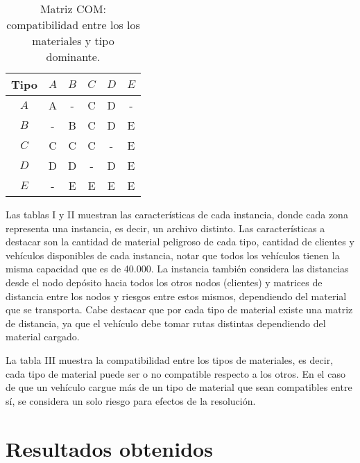 \documentclass[conference]{IEEEtran}
\begin{document}
\begin{table}[H]
\caption{Matriz COM: compatibilidad entre los los materiales y tipo dominante.}
\begin{center}
\begin{tabular}{|c|c|c|c|c|c|}
\hline
\textbf{Tipo}& $A$ & $B$ & $C$ & $D$ & $E$\\
 
\hline
$A$& A & - & C & D & -\\
\hline
$B$& - & B & C & D & E\\
\hline
$C$& C & C & C & - & E\\
\hline
$D$& D & D & - & D & E\\
\hline
$E$& - & E & E & E & E\\
\hline
\end{tabular}
\label{tab1}
\end{center}
\end{table}

Las tablas I y II muestran las caracter\'isticas de cada instancia, donde cada zona representa una instancia, es decir, un archivo distinto. Las caracter\'isticas a destacar son la cantidad de material peligroso de cada tipo, cantidad de clientes y veh\'iculos disponibles de cada instancia, notar que todos los veh\'iculos tienen la misma capacidad que es de 40.000. La instancia tambi\'en considera las distancias desde el nodo dep\'osito hacia todos los otros nodos (clientes) y matrices de distancia entre los nodos y riesgos entre estos mismos, dependiendo del material que se transporta. Cabe destacar que por cada tipo de material existe una matriz de distancia, ya que el veh\'iculo debe tomar rutas distintas dependiendo del material cargado.

La tabla III muestra la compatibilidad entre los tipos de materiales, es decir, cada tipo de material puede ser o no compatible respecto a los otros. En el caso de que un veh\'iculo cargue m\'as de un tipo de material que sean compatibles entre s\'i, se considera un solo riesgo para efectos de la resoluci\'on. 
\newpage

\section{Resultados obtenidos}
\end{document}
